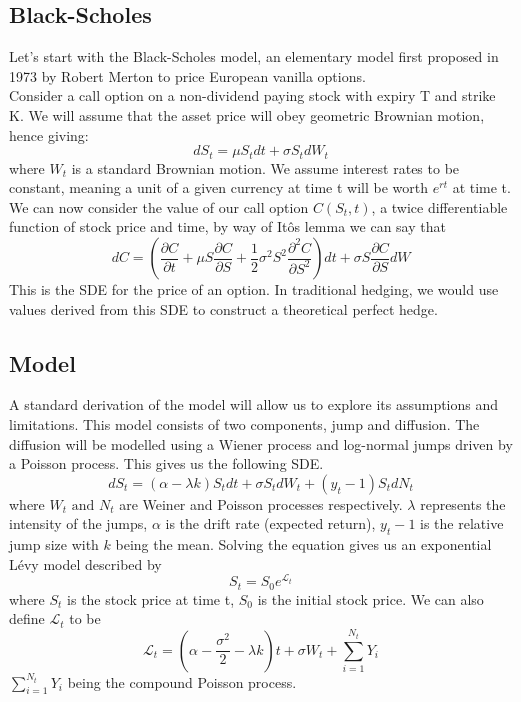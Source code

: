 \documentclass[12pt]{article}
\numberwithin{equation}{section}
\begin{document}
\subsection{Black-Scholes}
Let's start with the Black-Scholes model, an elementary model first proposed in 
1973 by Robert Merton to price European vanilla options. \autocite{blackscholes} \\
Consider a call option on a non-dividend paying stock with expiry T and strike K. 
We will assume that the asset price will obey geometric Brownian motion, hence 
giving: 
\begin{equation}
dS_t = \mu {S_t} dt + \sigma S_t dW_t
\end{equation}
where $W_t$ is a standard Brownian motion. We assume interest rates to be constant,
meaning a unit of a given currency at time t will be worth $e^{rt}$ at time t.\\
We can now consider the value of our call option $C(S_t,t)$, a twice differentiable 
function of stock price and time, by way of It\^{o}s 
lemma
we can say that 
\begin{equation}
dC = \left( \frac{\partial C}{\partial t} + \mu S \frac{\partial C}{\partial S} + \frac{1}{2} \sigma^2 S^2 \frac{\partial^2 C}{\partial S^2} \right) dt + \sigma S \frac{\partial C}{\partial S} dW
\end{equation}
This is the SDE for the price of an option. In traditional hedging, we would use 
values derived from this SDE to construct a theoretical perfect hedge. 
\subsection{Model}
A standard derivation of the model will allow us to explore its assumptions and 
limitations. This model consists of two components, jump and diffusion. The 
diffusion will be modelled using a Wiener process and log-normal jumps driven 
by a Poisson process\autocite{matsuda}. This gives us the following
SDE. 
\begin{equation}
  dS_t = (\alpha - \lambda k)S_tdt + \sigma S_t dW_t + (y_t-1)S_tdN_t
\end{equation}
where $W_t \text{ and } N_t$ are Weiner and Poisson processes respectively. 
$\lambda$ represents the intensity of the jumps, $\alpha$ is the drift rate
(expected return), $y_t - 1$ is the relative jump size with $k$ being the mean. 
Solving the equation gives us an exponential L\'{e}vy model described by 
\begin{equation}
  S_t = S_0e^{\mathcal{L}_t}
\end{equation}
where $S_t$ is the stock price at time t, $S_0$ is the initial stock price. 
We can also define $\mathcal{L}_t$ to be 
\begin{equation}
  \mathcal{L}_t = (\alpha - \frac{\sigma^2}{2}-\lambda k)t + \sigma W_t + 
  \sum^{N_t}_{i=1}Y_i
\end{equation}
$\sum_{i=1}^{N_t}Y_i$ being the compound Poisson process. 
\end{document}
